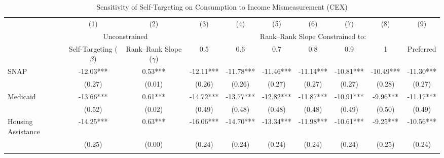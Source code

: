 \begin{table}[]     \footnotesize     \centering
\caption{Sensitivity of Self-Targeting on Consumption to Income Mismeasurement (CEX)}
\label{tab:constrained_reg_cex}
\begin{tabular*}{1.36\textwidth}{@{\extracolsep{\fill}}lccccccccc}
\toprule
                   & (1)                               & (2)                               & (3)                             & (4)                             & (5)                             & (6)                             & (7)                             & (8)                             & (9) \\
                   & \multicolumn{2}{c}{Unconstrained} & \multicolumn{7}{c}{Rank--Rank Slope Constrained to:} \\
\cmidrule{2-3}\cmidrule{4-10}
                   & Self-Targeting ($\beta$)          & Rank--Rank Slope ($\gamma$)       & 0.5                             & 0.6                             & 0.7                             & 0.8                             & 0.9                             & 1                               & Preferred \\
\midrule
\addlinespace
SNAP               & -12.03***        & 0.53***        & -12.11***        & -11.78***        & -11.46***        & -11.14***        & -10.81***        & -10.49***        & -11.30*** \\
                   & (0.27)            & (0.01)            & (0.26)            & (0.26)            & (0.27)            & (0.27)            & (0.27)            & (0.28)            & (0.27)     \\
\addlinespace
Medicaid           & -13.66***    & 0.61***    & -14.72***    & -13.77***    & -12.82***    & -11.87***    & -10.91***    & -9.96***    & -11.17*** \\
                   & (0.52)        & (0.02)        & (0.49)        & (0.48)        & (0.48)        & (0.48)        & (0.49)        & (0.50)        & (0.49)     \\
\addlinespace
Housing Assistance & -14.25***          & 0.63***          & -16.06***          & -14.70***          & -13.34***          & -11.98***          & -10.61***          & -9.25***          & -10.56*** \\
                   & (0.25)              & (0.00)              & (0.24)              & (0.24)              & (0.24)              & (0.24)              & (0.24)              & (0.25)              & (0.24)     \\
\addlinespace

\end{tabular*}
\end{table}
